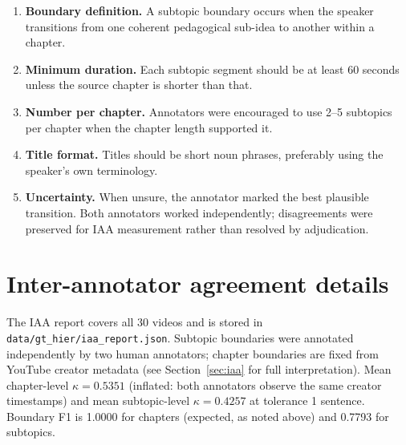 \begin{enumerate}
  \item \textbf{Boundary definition.}
    A subtopic boundary occurs when the speaker transitions from one coherent
    pedagogical sub-idea to another within a chapter.

  \item \textbf{Minimum duration.}
    Each subtopic segment should be at least 60 seconds unless the source
    chapter is shorter than that.

  \item \textbf{Number per chapter.}
    Annotators were encouraged to use 2--5 subtopics per chapter when the
    chapter length supported it.

  \item \textbf{Title format.}
    Titles should be short noun phrases, preferably using the speaker's own
    terminology.

  \item \textbf{Uncertainty.}
    When unsure, the annotator marked the best plausible transition. Both
    annotators worked independently; disagreements were preserved for IAA
    measurement rather than resolved by adjudication.
\end{enumerate}

\section{Inter-annotator agreement details}

The IAA report covers all 30 videos and is stored in
\texttt{data/gt\_hier/iaa\_report.json}. Subtopic boundaries were annotated
independently by two human annotators; chapter boundaries are fixed from
YouTube creator metadata (see Section~\ref{sec:iaa} for full interpretation).
Mean chapter-level $\kappa=0.5351$ (inflated: both annotators observe the
same creator timestamps) and mean subtopic-level $\kappa=0.4257$ at
tolerance 1 sentence. Boundary F1 is 1.0000 for chapters (expected, as
noted above) and 0.7793 for subtopics.
